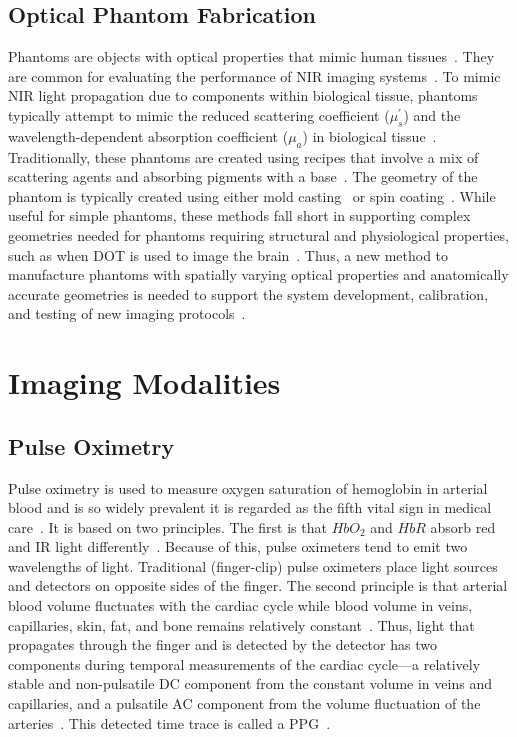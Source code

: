 \subsection{Optical Phantom Fabrication}
Phantoms are objects with optical properties that mimic human tissues~\cite{Pogue2006}. They are common for evaluating the performance of \ac{NIR} imaging systems~\cite{Pogue2006}. To mimic \ac{NIR} light propagation due to components within biological tissue, phantoms typically attempt to mimic the reduced scattering coefficient ($\mu_s^{'}$) and the wavelength-dependent absorption coefficient ($\mu_a$) in biological tissue~\cite{Dempsey2017}. Traditionally, these phantoms are created using recipes that involve a mix of scattering agents and absorbing pigments with a base~\cite{Hebden1995,Dong2015}. The geometry of the phantom is typically created using either mold casting~\cite{Hahn2012,Mobashsher2014} or spin coating~\cite{Park2013}. While useful for simple phantoms, these methods fall short in supporting complex geometries needed for phantoms requiring structural and physiological properties, such as when \ac{DOT} is used to image the brain~\cite{Hebden2002,Villringer1997}. Thus, a new method to manufacture phantoms with spatially varying optical properties and anatomically accurate geometries is needed to support the system development, calibration, and testing of new imaging protocols~\cite{Cerussi2012,Diep2015}.  



\section{Imaging Modalities}
\label{chap:background:modalities}
\subsection{Pulse Oximetry}
Pulse oximetry is used to measure oxygen saturation of hemoglobin in arterial blood and is so widely prevalent it is regarded as the fifth vital sign in medical care~\cite{Neff1988}. It is based on two principles. The first is that $HbO_2$ and $HbR$ absorb red and \ac{IR} light differently~\cite{Bohn2015}. Because of this, pulse oximeters tend to emit two wavelengths of light. Traditional (finger-clip) pulse oximeters place light sources and detectors on opposite sides of the finger. The second principle is that arterial blood volume fluctuates with the cardiac cycle while blood volume in veins, capillaries, skin, fat, and bone remains relatively constant~\cite{Sinex1999}. Thus, light that propagates through the finger and is detected by the detector has two components during temporal measurements of the cardiac cycle---a relatively stable and non-pulsatile \ac{DC} component from the constant volume in veins and capillaries, and a pulsatile \ac{AC} component from the volume fluctuation of the arteries~\cite{Lopez2012}. This detected time trace is called a \ac{PPG}~\cite{Sinex1999}. 

